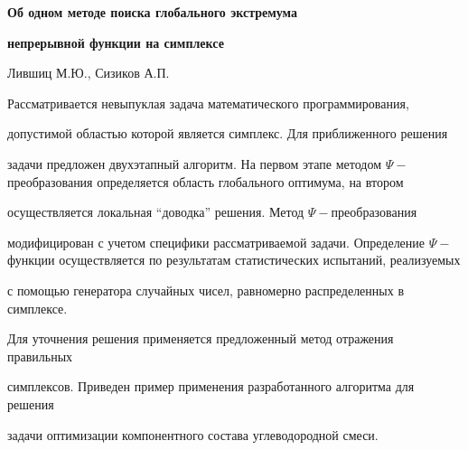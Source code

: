 \documentclass [12pt]{article}
\begin{document}
\begin{center}

\textbf{Об одном методе поиска глобального экстремума }

\end{center}



\begin{center}

\textbf{непрерывной функции на симплексе}

\end{center}











\begin{center}

Лившиц М.Ю., Сизиков А.П.

\end{center}











Рассматривается невыпуклая задача математического программирования, 

допустимой областью которой является симплекс. Для приближенного решения 

задачи предложен двухэтапный алгоритм. На первом этапе методом $\Psi - 

$преобразования определяется область глобального оптимума, на втором 

осуществляется локальная ``доводка'' решения. Метод $\Psi - $преобразования 

модифицирован с учетом специфики рассматриваемой задачи. Определение $\Psi - 

$функции осуществляется по результатам статистических испытаний, реализуемых 

с помощью генератора случайных чисел, равномерно распределенных в симплексе. 

Для уточнения решения применяется предложенный метод отражения правильных 

симплексов. Приведен пример применения разработанного алгоритма для решения 

задачи оптимизации компонентного состава углеводородной смеси.
\end{document}

